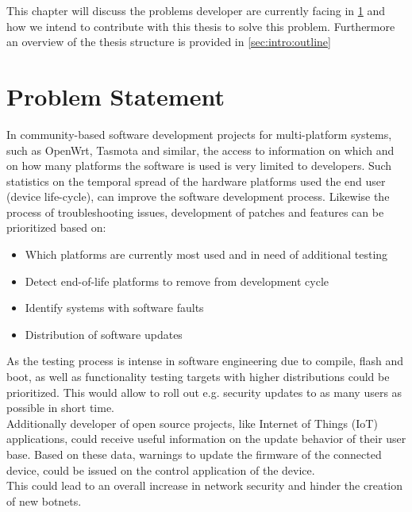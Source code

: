This chapter will discuss the problems developer are currently facing in \ref{sec:intro:probstatement} and how
we intend to contribute with this thesis to solve this problem. Furthermore an 
overview of the thesis structure is provided in \ref{sec:intro:outline}




\section{Problem Statement}
\label{sec:intro:probstatement}
%
In community-based software development projects for multi-platform systems, such as
OpenWrt, Tasmota and similar, the access to information on which and on how many platforms
the software is used is very limited to developers.
Such statistics on the temporal spread of the hardware platforms used
the end user (device life-cycle), can improve the software development process.
Likewise the process of troubleshooting issues, development of patches and features can be prioritized based on:
\begin{itemize}
    \item Which platforms are currently most used and in need of additional testing
    \item Detect end-of-life platforms to remove from development cycle
    \item Identify systems with software faults
    \item Distribution of software updates
\end{itemize}

As the testing process is intense in software engineering due to compile, flash and boot, as well as functionality testing targets with higher distributions could be prioritized.
This would allow to roll out e.g. security updates to as many users as possible in short time.\\

Additionally developer of open source projects, like Internet of Things (IoT) applications, could receive useful
information on the update behavior of their user base. Based on these data, warnings to update the firmware of the
connected device, could be issued on the control application of the device.\\
This could lead to an overall increase in network security and hinder the creation of new botnets.\\

